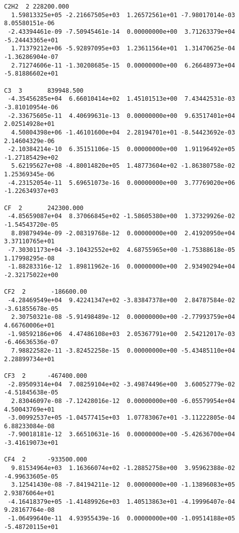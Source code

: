 \begin{verbatim}
C2H2  2	228200.000							 
  1.59813325e+05 -2.21667505e+03  1.26572561e+01 -7.98017014e-03  8.05580151e-06
 -2.43394461e-09 -7.50945461e-14  0.00000000e+00  3.71263379e+04 -5.24443365e+01
  1.71379212e+06 -5.92897095e+03  1.23611564e+01  1.31470625e-04 -1.36286904e-07
  2.71274606e-11 -1.30208685e-15  0.00000000e+00  6.26648973e+04 -5.81886602e+01
										 
C3  3		839948.500							 
 -4.35456285e+04  6.66010414e+02  1.45101513e+00  7.43442531e-03 -3.81010954e-06
 -2.33675605e-11  4.40699631e-13  0.00000000e+00  9.63517401e+04  2.02514928e+01
  4.50804398e+06 -1.46101600e+04  2.28194701e+01 -8.54423692e-03  2.14604329e-06
 -2.10384214e-10  6.35151106e-15  0.00000000e+00  1.91196492e+05 -1.27185429e+02
  5.62195627e+08 -4.80014820e+05  1.48773604e+02 -1.86380758e-02  1.25369345e-06
 -4.23152054e-11  5.69651073e-16  0.00000000e+00  3.77769020e+06 -1.22634937e+03
										 
CF  2		242300.000							 
 -4.85659087e+04  8.37066845e+02 -1.58605380e+00  1.37329926e-02 -1.54543720e-05
  8.89879494e-09 -2.08319768e-12  0.00000000e+00  2.41920950e+04  3.37110765e+01
 -7.30301173e+04 -3.10432552e+02  4.68755965e+00 -1.75388618e-05  1.17998295e-08
 -1.88283316e-12  1.89811962e-16  0.00000000e+00  2.93490294e+04 -2.32175022e+00
										 
CF2  2		 -186600.00						         
 -4.28469549e+04  9.42241347e+02 -3.83847378e+00  2.84787584e-02 -3.61855678e-05
  2.30750321e-08 -5.91498489e-12  0.00000000e+00 -2.77993759e+04  4.66760006e+01
 -1.98592186e+06  4.47486108e+03  2.05367791e+00  2.54212017e-03 -6.46636536e-07
  7.98822582e-11 -3.82452258e-15  0.00000000e+00 -5.43485110e+04  2.28899734e+01
										 
CF3  2		-467400.000						         
 -2.89509314e+04  7.08259104e+02 -3.49874496e+00  3.60052779e-02 -4.51845638e-05
  2.83046097e-08 -7.12428016e-12  0.00000000e+00 -6.05579954e+04  4.50043769e+01
 -3.00992537e+05 -1.04577415e+03  1.07783067e+01 -3.11222805e-04  6.88233084e-08
 -7.90018181e-12  3.66510631e-16  0.00000000e+00 -5.42636700e+04 -3.41619073e+01
										 
CF4  2		-933500.000						         
  9.81534964e+03  1.16366074e+02 -1.28852758e+00  3.95962388e-02 -4.99633605e-05
  3.12541430e-08 -7.84194211e-12  0.00000000e+00 -1.13896083e+05  2.93876064e+01
 -4.16418379e+05 -1.41489926e+03  1.40513863e+01 -4.19996407e-04  9.28167764e-08
 -1.06499640e-11  4.93955439e-16  0.00000000e+00 -1.09514188e+05 -5.48720115e+01
										 

\end{verbatim}
